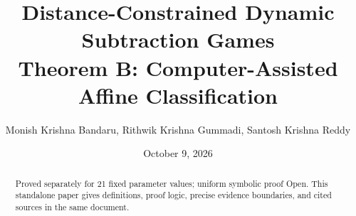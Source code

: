 \documentclass[11pt]{article}
\title{\textbf{Distance-Constrained Dynamic Subtraction Games}\\[0.4em]Theorem B: Computer-Assisted Affine Classification}
\author{Monish Krishna Bandaru, Rithwik Krishna Gummadi, Santosh Krishna Reddy}
\date{October 9, 2026}
\begin{document}
\maketitle
\begin{abstract}Proved separately for 21 fixed parameter values; uniform symbolic proof Open. This standalone paper gives definitions, proof logic, precise evidence boundaries, and cited sources in the same document.\end{abstract}
\tableofcontents



\end{document}
